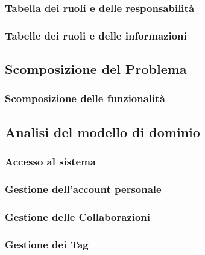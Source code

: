 \documentclass{article}
\begin{document}
\subsubsection{Tabella dei ruoli e delle responsabilità}

\subsubsection{Tabelle dei ruoli e delle informazioni}

\pagebreak

\subsection{Scomposizione del Problema}
\subsubsection{Scomposizione delle funzionalità}

% 

\subsection{Analisi del modello di dominio}
\subsubsection{Accesso al sistema}

\subsubsection{Gestione dell'account personale}

\subsubsection{Gestione delle Collaborazioni}

\subsubsection{Gestione dei Tag}

\end{document}
